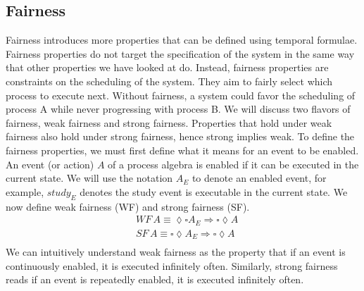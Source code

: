 \subsection{Fairness}
Fairness introduces more properties that can be defined using temporal formulae. Fairness properties do not target the specification of the system in the same way that other properties we have looked at do. Instead, fairness properties are constraints on the scheduling of the system. They aim to fairly select which process to execute next. Without fairness, a system could favor the scheduling of process A while never progressing with process B. We will discuss two flavors of fairness, weak fairness and strong fairness. Properties that hold under weak fairness also hold under strong fairness, hence strong implies weak. To define the fairness properties, we must first define what it means for an event to be enabled. An event (or action) $A$ of a process algebra is enabled if it can be executed in the current state. We will use the notation $A_E$ to denote an enabled event, for example, $study_E$ denotes the study event is executable in the current state. We now define weak fairness (WF) and strong fairness (SF).
\[
\begin{aligned}
&WF \, A \equiv \lozenge \square A_E \Rightarrow \square \lozenge A \\
&SF \, A \equiv \square \lozenge A_E \Rightarrow \square \lozenge A \\
\end{aligned}
\]
We can intuitively understand weak fairness as the property that if an event is continuously enabled, it is executed infinitely often. Similarly, strong fairness reads if an event is repeatedly enabled, it is executed infinitely often.
